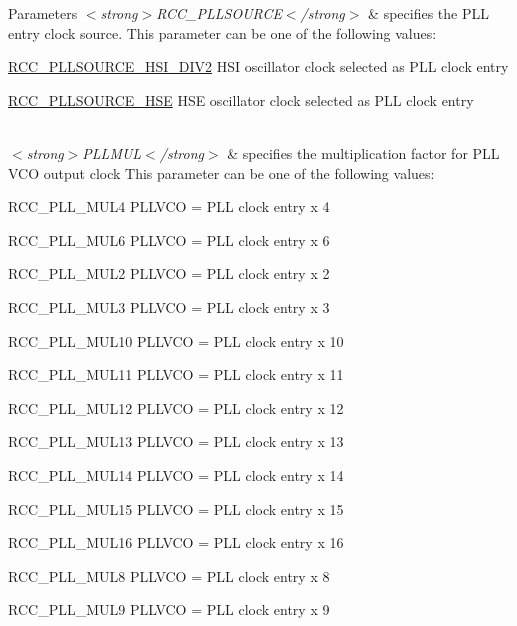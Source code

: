 \begin{DoxyParams}{Parameters}
{\em $<$strong$>$\+R\+C\+C\+\_\+\+P\+L\+L\+S\+O\+U\+R\+C\+E$<$/strong$>$} & specifies the P\+LL entry clock source. This parameter can be one of the following values\+: \begin{DoxyItemize}
\item \hyperlink{group___r_c_c___p_l_l___clock___source_ga09fff12a4e92f4da5980321b7f99b632}{R\+C\+C\+\_\+\+P\+L\+L\+S\+O\+U\+R\+C\+E\+\_\+\+H\+S\+I\+\_\+\+D\+I\+V2} H\+SI oscillator clock selected as P\+LL clock entry \item \hyperlink{group___r_c_c___p_l_l___clock___source_ga197cea7fe5c2db26fe7fcdb0f99dd4d7}{R\+C\+C\+\_\+\+P\+L\+L\+S\+O\+U\+R\+C\+E\+\_\+\+H\+SE} H\+SE oscillator clock selected as P\+LL clock entry \end{DoxyItemize}
\\
\hline
{\em $<$strong$>$\+P\+L\+L\+M\+U\+L$<$/strong$>$} & specifies the multiplication factor for P\+LL V\+CO output clock This parameter can be one of the following values\+: \begin{DoxyItemize}
\item R\+C\+C\+\_\+\+P\+L\+L\+\_\+\+M\+U\+L4 P\+L\+L\+V\+CO = P\+LL clock entry x 4 \item R\+C\+C\+\_\+\+P\+L\+L\+\_\+\+M\+U\+L6 P\+L\+L\+V\+CO = P\+LL clock entry x 6 \item R\+C\+C\+\_\+\+P\+L\+L\+\_\+\+M\+U\+L2 P\+L\+L\+V\+CO = P\+LL clock entry x 2 \item R\+C\+C\+\_\+\+P\+L\+L\+\_\+\+M\+U\+L3 P\+L\+L\+V\+CO = P\+LL clock entry x 3 \item R\+C\+C\+\_\+\+P\+L\+L\+\_\+\+M\+U\+L10 P\+L\+L\+V\+CO = P\+LL clock entry x 10 \item R\+C\+C\+\_\+\+P\+L\+L\+\_\+\+M\+U\+L11 P\+L\+L\+V\+CO = P\+LL clock entry x 11 \item R\+C\+C\+\_\+\+P\+L\+L\+\_\+\+M\+U\+L12 P\+L\+L\+V\+CO = P\+LL clock entry x 12 \item R\+C\+C\+\_\+\+P\+L\+L\+\_\+\+M\+U\+L13 P\+L\+L\+V\+CO = P\+LL clock entry x 13 \item R\+C\+C\+\_\+\+P\+L\+L\+\_\+\+M\+U\+L14 P\+L\+L\+V\+CO = P\+LL clock entry x 14 \item R\+C\+C\+\_\+\+P\+L\+L\+\_\+\+M\+U\+L15 P\+L\+L\+V\+CO = P\+LL clock entry x 15 \item R\+C\+C\+\_\+\+P\+L\+L\+\_\+\+M\+U\+L16 P\+L\+L\+V\+CO = P\+LL clock entry x 16 \item R\+C\+C\+\_\+\+P\+L\+L\+\_\+\+M\+U\+L8 P\+L\+L\+V\+CO = P\+LL clock entry x 8 \item R\+C\+C\+\_\+\+P\+L\+L\+\_\+\+M\+U\+L9 P\+L\+L\+V\+CO = P\+LL clock entry x 9 \end{DoxyItemize}
\\
\hline
\end{DoxyParams}


